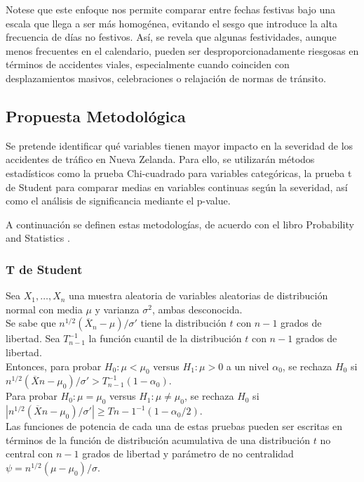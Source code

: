 \documentclass{book}
\begin{document}
Notese que este enfoque nos permite comparar entre fechas festivas bajo una escala que llega a ser más homogénea, evitando el sesgo que introduce la alta frecuencia de días no festivos. Así, se revela que algunas festividades, aunque menos frecuentes en el calendario, pueden ser desproporcionadamente riesgosas en términos de accidentes viales, especialmente cuando coinciden con desplazamientos masivos, celebraciones o relajación de normas de tránsito.

\newpage

\subsection{Propuesta Metodológica}
Se pretende identificar qué variables tienen mayor impacto en la severidad de los accidentes de tráfico en Nueva Zelanda. Para ello, se utilizarán métodos estadísticos como la prueba Chi-cuadrado para variables categóricas, la prueba t de Student para comparar medias en variables continuas según la severidad, así como el análisis de significancia mediante el p-value. 

A continuación se definen estas metodologías, de acuerdo con el libro Probability and Statistics \cite{degroot2012probability}.

\subsubsection{T de Student}
Sea $X_1, \ldots, X_n$ una muestra aleatoria de variables aleatorias de distribución normal con media $\mu$ y varianza $\sigma^2$, ambas desconocida. \\
Se sabe que $n^{1/2}(\overline{X}_n - \mu)/\sigma'$ tiene la distribución $t$ con $n - 1$ grados de libertad. Sea $T_{n-1}^{-1}$ la función cuantil de la distribución $t$ con $n - 1$ grados de libertad.\\
Entonces, para probar $H_0: \mu < \mu_0$ versus $H_1: \mu > 0$ a un nivel $\alpha_0$, se rechaza $H_0$ si $n^{1/2}(\overline{X}n - \mu_0)/\sigma' > T_{n-1}^{-1}(1 - \alpha_0)$. \\
Para probar $H_0: \mu = \mu_0$ versus $H_1: \mu \neq \mu_0$, se rechaza $H_0$ si $|n^{1/2}(\overline{X}n - \mu_0)/\sigma'| \geq T{n-1}^{-1}(1 - \alpha_0/2)$. \\
Las funciones de potencia de cada una de estas pruebas pueden ser escritas en términos de la función de distribución acumulativa de una distribución $t$ no central con $n - 1$ grados de libertad y parámetro de no centralidad $\psi = n^{1/2}(\mu - \mu_0)/\sigma$.
\end{document}
